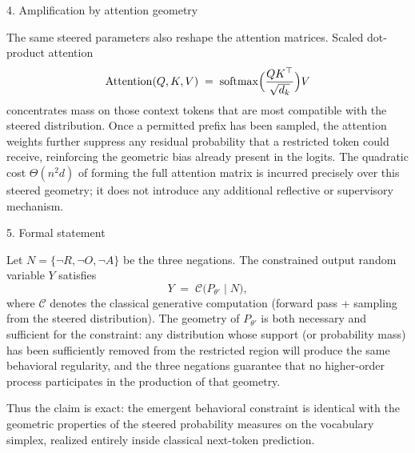 4. Amplification by attention geometry

The same steered parameters also reshape the attention matrices. Scaled dot-product attention
\[
\operatorname{Attention}(Q,K,V)
\;=\;
\operatorname{softmax}\Bigl(\frac{QK^\top}{\sqrt{d_k}}\Bigr)V
\]
concentrates mass on those context tokens that are most compatible with the steered distribution. Once a permitted prefix has been sampled, the attention weights further suppress any residual probability that a restricted token could receive, reinforcing the geometric bias already present in the logits. The quadratic cost \(\Theta(n^2 d)\) of forming the full attention matrix is incurred precisely over this steered geometry; it does not introduce any additional reflective or supervisory mechanism.

5. Formal statement

Let \(N=\{\neg R,\neg O,\neg A\}\) be the three negations. The constrained output random variable \(Y\) satisfies
\[
Y\;=\;\mathcal{C}\bigl(P_{\theta'}\mid N\bigr),
\]
where \(\mathcal{C}\) denotes the classical generative computation (forward pass + sampling from the steered distribution). The geometry of \(P_{\theta'}\) is both necessary and sufficient for the constraint: any distribution whose support (or probability mass) has been sufficiently removed from the restricted region will produce the same behavioral regularity, and the three negations guarantee that no higher-order process participates in the production of that geometry.

Thus the claim is exact: the emergent behavioral constraint is identical with the geometric properties of the steered probability measures on the vocabulary simplex, realized entirely inside classical next-token prediction.
